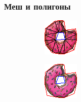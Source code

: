\documentclass[10pt, unicode]{beamer}
\begin{document}
    \begin{frame}
        \frametitle{Меш и полигоны}
        \begin{figure}[H]
            \centering
            \begin{subfigure}{.49\linewidth}
                \centering
                \includegraphics[scale=1.5]{donutpixel_mesh.png}
            \end{subfigure}
            \begin{subfigure}{.49\linewidth}
                \centering
                \includegraphics[scale=1.5]{donutpixel_approx_mid.png}
            \end{subfigure}
        \end{figure}
    \end{frame}
\end{document}
